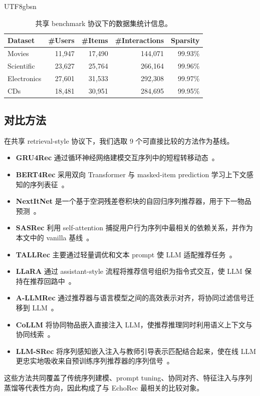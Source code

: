 \documentclass{article}
\begin{document}
\begin{CJK*}{UTF8}{gbsn}
\begin{table}[H]
\centering
\caption{共享 benchmark 协议下的数据集统计信息。}
\label{tab:dataset_stats}
\small
\setlength{\tabcolsep}{7pt}
\renewcommand{\arraystretch}{1.1}
\begin{tabular}{lrrrr}
\toprule
Dataset & \#Users & \#Items & \#Interactions & Sparsity \\
\midrule
Movies & 11,947 & 17,490 & 144,071 & 99.93\% \\
Scientific & 23,627 & 25,764 & 266,164 & 99.96\% \\
Electronics & 27,601 & 31,533 & 292,308 & 99.97\% \\
CDs & 18,481 & 30,951 & 284,695 & 99.95\% \\
\bottomrule
\end{tabular}
\end{table}

\subsection{对比方法}
\label{app:baselines}

\noindent 在共享 retrieval-style 协议下，我们选取 9 个可直接比较的方法作为基线。
\begin{itemize}[leftmargin=1.5em]
\item \textbf{GRU4Rec} 通过循环神经网络建模交互序列中的短程转移动态~\cite{hidasi2016gru4rec}。
\item \textbf{BERT4Rec} 采用双向 Transformer 与 masked-item prediction 学习上下文感知的序列表征~\cite{sun2019bert4rec}。
\item \textbf{NextItNet} 是一个基于空洞残差卷积块的自回归序列推荐器，用于下一物品预测~\cite{yuan2019nextitnet}。
\item \textbf{SASRec} 利用 self-attention 捕捉用户行为序列中最相关的依赖关系，并作为本文中的 vanilla 基线~\cite{kang2018sasrec}。
\item \textbf{TALLRec} 主要通过轻量调优和文本 prompt 使 LLM 适配推荐任务~\cite{bao2023tallrec}。
\item \textbf{LLaRA} 通过 assistant-style 流程将推荐信号组织为指令式交互，使 LLM 保持在推荐回路中~\cite{liao2024llara}。
\item \textbf{A-LLMRec} 通过推荐器与语言模型之间的高效表示对齐，将协同过滤信号迁移到 LLM~\cite{kim2024allmrec}。
\item \textbf{CoLLM} 将协同物品嵌入直接注入 LLM，使推荐推理同时利用语义上下文与协同线索~\cite{zhang2025collm}。
\item \textbf{LLM-SRec} 将序列感知嵌入注入与教师引导表示匹配结合起来，使在线 LLM 更忠实地吸收来自预训练序列推荐器的序列信号~\cite{kim2025lost}。
\end{itemize}
这些方法共同覆盖了传统序列建模、prompt tuning、协同对齐、特征注入与序列蒸馏等代表性方向，因此构成了与 EchoRec 最相关的比较对象。


\end{CJK*}
\end{document}
